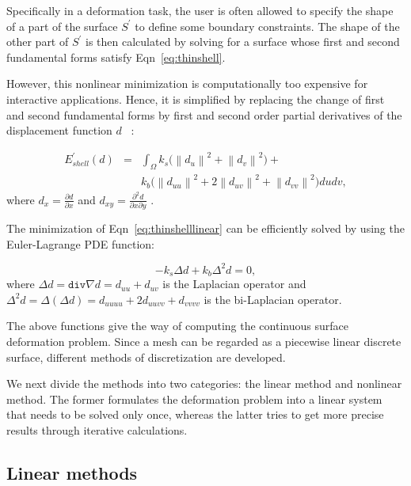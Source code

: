 Specifically in a deformation task, the user is often allowed to specify the shape of a part of the surface $S^\prime$ to define some boundary constraints. The shape of the other part of $S^\prime$ is then calculated by solving for a surface whose first and second fundamental forms satisfy Eqn~\ref{eq:thinshell}.

However, this nonlinear minimization is computationally too expensive for interactive applications. Hence, it is simplified by replacing the change of first and second fundamental forms by first and second order partial derivatives of the displacement function $d$~\cite{CG91,WW92} :

\begin{eqnarray}
\label{eq:thinshelllinear}
E_{shell}^\prime(d) &=& \int_{\Omega}{k_s \Big( {\left\| {d_u} \right\|}^2 + {\left\| {d_v} \right\|}^2 \Big )}+\nonumber\\
& & k_b \Big( {\left\| {d_{uu}} \right\|}^2 + 2{\left\| {d_{uv}} \right\|}^2 +{\left\| {d_{vv}} \right\|}^2 \Big )dudv ,
\end{eqnarray}
where $d_x=\frac{{\partial d}}{{\partial x}}$ and $d_{xy}=\frac{{\partial^2 d}}{{\partial x}{\partial y}}$ .

The minimization of Eqn~\ref{eq:thinshelllinear} can be efficiently solved by using the Euler-Lagrange PDE function:

\begin{equation}
\label{eq:ELPDE}
	-k_s\Delta d+k_b\Delta^2 d=0,
\end{equation}
where $\Delta d=\texttt{div}\nabla d=d_{uu}+d_{uv}$ is the Laplacian operator and $\Delta^2 d=\Delta(\Delta d)=d_{uuuu}+2d_{uuvv}+d_{vvvv}$ is the bi-Laplacian operator.

The above functions give the way of computing the continuous surface deformation problem. Since a mesh can be regarded as a piecewise linear discrete surface, different methods of discretization are developed.

We next divide the methods into two categories: the linear method and nonlinear method. The former formulates the deformation problem into a linear system that needs to be solved only once, whereas the latter tries to get more precise results through iterative calculations.

\subsection{Linear methods}\label{ch2:sec:deformation:linear}

